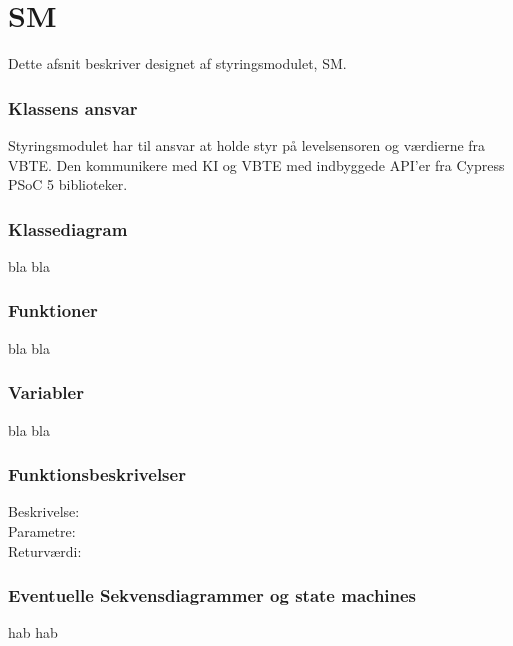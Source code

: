 \chapter{SM}
Dette afsnit beskriver designet af styringsmodulet, SM.
\subsection{Klassens ansvar}
Styringsmodulet har til ansvar at holde styr på levelsensoren og værdierne fra VBTE. Den kommunikere med KI og VBTE med indbyggede API'er fra Cypress PSoC 5 biblioteker. 
\subsection{Klassediagram}
bla bla
\subsection{Funktioner}
bla bla
\subsection{Variabler}
bla bla
\subsection{Funktionsbeskrivelser}
Beskrivelse:\\
Parametre:\\
Returværdi:\\
\subsection{Eventuelle Sekvensdiagrammer og state machines}
hab hab